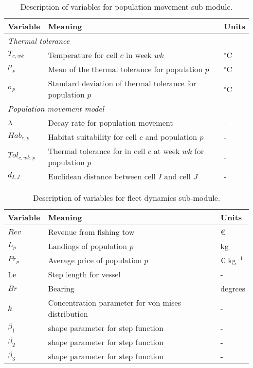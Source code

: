 \begin{table}[!ht]
	\centering
	\caption{Description of variables for population movement sub-module.}
	\begin{tabular}{p{1.5cm} p{8cm} p{1.5cm}}
		\toprule
		Variable & Meaning & Units \\
		\hline
		\multicolumn{3}{l}{\textit{Thermal tolerance}} \\
		\hline
		$T_{c,wk}$ & Temperature for cell $c$ in week $wk$ & $^\circ$C \\
		$\mu_{p}$ & Mean of the thermal tolerance for population $p$ & $^\circ$C \\
		$\sigma_{p}$ & Standard deviation of thermal tolerance for
		population $p$ & $^\circ$C \\
		\hline
		\multicolumn{3}{l}{\textit{Population movement model}} \\
		\hline
		$\lambda$ & Decay rate for population movement & - \\
		$Hab_{c,p}$ & Habitat suitability for cell $c$ and
		population $p$ & - \\
		$Tol_{c,wk,p}$ & Thermal tolerance for in cell $c$ at week $wk$
		for population $p$ & - \\
		$d_{I,J}$ & Euclidean distance between cell $I$ and cell $J$ & - \\
		\bottomrule
		\end{tabular}
	\end{table}

\begin{table}[!ht]
	\centering
	\caption{Description of variables for fleet dynamics sub-module.}
	\begin{tabular}{p{1.5cm} p{8cm} p{1.5cm}}
		\toprule
		Variable & Meaning & Units \\
		\hline
		$Rev$ & Revenue from fishing tow & \euro \\
		$L_{p}$ & Landings of population $p$ & kg \\
		$Pr_{p}$ & Average price of population $p$ & \euro
		\hspace{0.1cm} kg$^{-1}$ \\
		Le & Step length for vessel & - \\
		$Br$ & Bearing & degrees \\
		$k$ & Concentration parameter for von mises distribution & - \\
		$\beta_{1}$ & shape parameter for step function & - \\
		$\beta_{2}$ & shape parameter for step function & - \\
		$\beta_{3}$ & shape parameter for step function & - \\
		\bottomrule
	\end{tabular}
\end{table}


